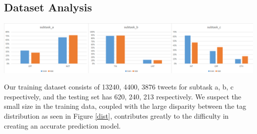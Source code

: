 \documentclass[a4paper, 12pt]{article}
\begin{document}
        \subsection{Dataset Analysis}
        
        \begin{center}
            \includegraphics[width=\linewidth]{images/dist.png}
            \label{dist}
        \end{center}

        Our training dataset consists of 13240, 4400,  3876 tweets for subtask a, b, c respectively, and the testing set has 620, 240, 213 respectively. We suspect the small size in the training data, coupled with the large disparity between the tag distribution as seen in Figure \ref{dist}, contributes greatly to the difficulty in creating an accurate prediction model.
        
\end{document}
